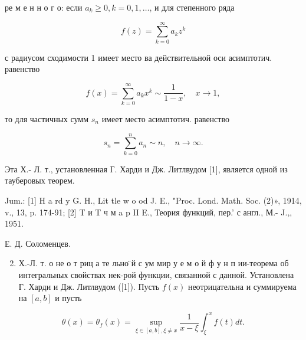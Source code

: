 \documentclass[10pt]{article}
\begin{document}
ре м е н н о г о: если $a_{k} \geqslant 0, k=0,1, \ldots$, и для степенного ряда



\[

f(z)=\sum_{k=0}^{\infty} a_{k} z^{k}

\]



с радиусом сходимости 1 имеет место ва действительной оси асимптотич. равенство



\[

f(x)=\sum_{k=0}^{\infty} a_{k} x^{k} \sim \frac{1}{1-x}, \quad x \rightarrow 1,

\]



то для частичных сумм $s_{n}$ имеет место асимптотич. равенство



\[

s_{n}=\sum_{k=0}^{n} a_{n} \sim n, \quad n \rightarrow \infty .

\]



Эта Х.- Л. т., установленная Г. Харди и Дж. Литлвудом [1], является одной из тауберовых теорем.



Jum.: [1] H a rd y G. H., Lit tle w o od J. E., "Proc. Lond. Math. Soc. (2)», 1914, v., 13, p. 174-91; [2] T и T ч м a p II E., Теория функций, пер.' с англ., М.- J.,, 1951.



Е. Д. Соломенцев.



\begin{enumerate}

  \setcounter{enumi}{1}

  \item Х.-Л. т. о не о т риц а те льно ̈й с ум мир у е м о й ф у н п ии-теорема об интегральных свойствах нек-рой функции, связанной с данной. Установлена Г. Харди и Дж. Литлвудом ([1]). Пусть $f(x)$ неотрицательна и суммируема на $[a, b]$ и пусть

\end{enumerate}



\[

\theta(x)=\theta_{f}(x)=\sup _{\xi \in[a, b], \xi \neq x} \frac{1}{x-\xi} \int_{\xi}^{x} f(t) d t .

\]
\end{document}
